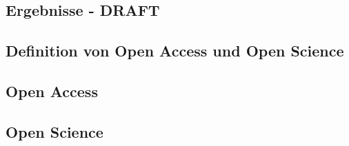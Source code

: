 \subsection{Ergebnisse - DRAFT}
\subsection{Definition von Open Access und Open Science}
\subsection{Open Access}
\subsection{Open Science}
